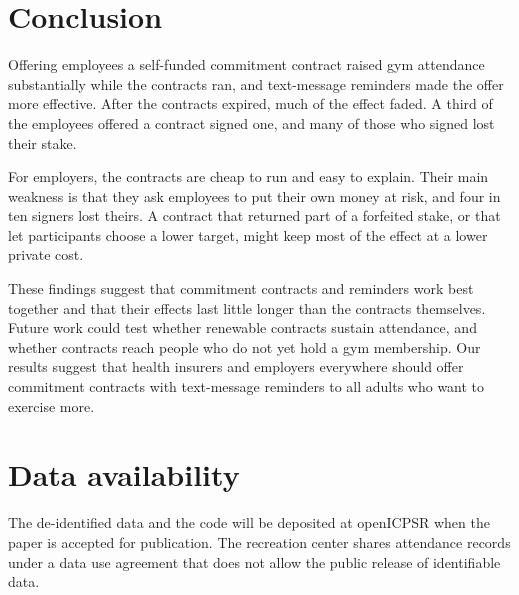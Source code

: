 \section{Conclusion}
\label{sec:conclusion}
Offering employees a self-funded commitment contract raised gym attendance substantially while the contracts ran, and text-message reminders made the offer more effective. After the contracts expired, much of the effect faded. A third of the employees offered a contract signed one, and many of those who signed lost their stake.

For employers, the contracts are cheap to run and easy to explain. Their main weakness is that they ask employees to put their own money at risk, and four in ten signers lost theirs. A contract that returned part of a forfeited stake, or that let participants choose a lower target, might keep most of the effect at a lower private cost.

These findings suggest that commitment contracts and reminders work best together and that their effects last little longer than the contracts themselves. Future work could test whether renewable contracts sustain attendance, and whether contracts reach people who do not yet hold a gym membership. Our results suggest that health insurers and employers everywhere should offer commitment contracts with text-message reminders to all adults who want to exercise more.

\section*{Data availability}
The de-identified data and the code will be deposited at openICPSR when the paper is accepted for publication. The recreation center shares attendance records under a data use agreement that does not allow the public release of identifiable data.
